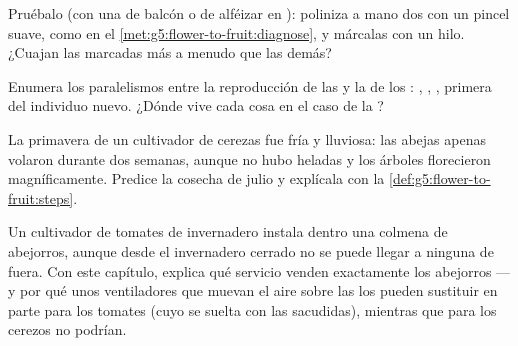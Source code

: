 \begin{exercise}[$\star$]\label{exo:g5:flower-to-fruit:8}
Pruébalo (con una  de balcón o de alféizar en ): poliniza a
mano dos  con un pincel suave, como en el
\cref{met:g5:flower-to-fruit:diagnose}, y márcalas con un hilo. ¿Cuajan
 las  marcadas más a menudo que las demás?
\end{exercise}

\begin{exercise}[$\star\star$]\label{exo:g5:flower-to-fruit:9}
Enumera los paralelismos entre la reproducción de las  y la de
los :  ,  , ,
primera  del individuo nuevo. ¿Dónde vive cada cosa en el caso
de la ?
\end{exercise}

\begin{exercise}[$\star\star$]\label{exo:g5:flower-to-fruit:10}
La primavera de un cultivador de cerezas fue fría y lluviosa: las
abejas apenas volaron durante dos semanas, aunque no hubo heladas y
los árboles florecieron magníficamente. Predice la cosecha de julio y
explícala con la \cref{def:g5:flower-to-fruit:steps}.
\end{exercise}

\begin{exercise}[$\star\star\star$]\label{exo:g5:flower-to-fruit:11}
Un cultivador de tomates de invernadero instala dentro una colmena de
abejorros, aunque desde el invernadero cerrado no se puede llegar a
ninguna  de fuera. Con este capítulo, explica qué servicio venden
exactamente los abejorros --- y por qué unos ventiladores que muevan
el aire sobre las  los pueden sustituir en parte para los
tomates (cuyo  se suelta con las sacudidas), mientras que para
los cerezos no podrían.
\end{exercise}
